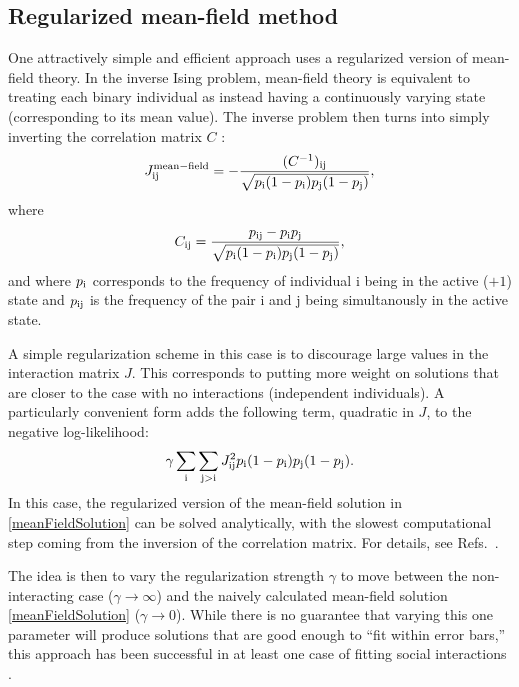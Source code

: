 \documentclass[aps,prl,twocolumn,nofootinbib]{revtex4-1}
\begin{document}
\subsection{Regularized mean-field method}
One attractively simple and efficient approach uses a regularized version of
mean-field theory.  In the inverse Ising problem, mean-field theory is equivalent
to treating each binary individual as instead having a continuously varying state
(corresponding to its mean value).  The inverse problem then turns into simply inverting
the correlation matrix $C$ \cite{CocMon12}:
\begin{equation}
\label{meanFieldSolution}
J^{\mathrm{mean-field}}_{\rm ij} =
    - \frac{ (C^{-1})_{\rm ij} }{ \sqrt{p_{\rm i}(1-p_{\rm i})p_{\rm j}(1-p_{\rm j})} },
\end{equation}
where
\begin{equation}
C_{\rm ij} = \frac{ p_{\rm ij} - p_{\rm i} p_{\rm j} }{ \sqrt{p_{\rm i}(1-p_{\rm i})p_{\rm j}(1-p_{\rm j})} },
\end{equation}
and where $p_{\rm i}$ corresponds to the frequency of individual i being
in the active ($+1$) state and $p_{\rm ij}$ is the frequency of the pair
i and j being simultanously in the active state.

A simple regularization scheme in this case is to discourage large values in the interaction
matrix $J$.  This corresponds to putting more weight on solutions that are closer to
the case with no interactions (independent individuals).  A particularly convenient form
adds the following term, quadratic in $J$, to the negative log-likelihood:
\begin{equation}
\gamma \sum_{\rm i} \sum_{\rm j > i} J_{\rm ij}^2 p_{\rm i} (1-p_{\rm i}) p_{\rm j} (1-p_{\rm j}).
\end{equation}
In this case, the regularized version of the mean-field solution in \eqref{meanFieldSolution}
can be solved analytically, with the slowest computational step coming from the inversion
of the correlation matrix.  For details, see Refs.~\cite{Daniels:1cq,BarCoc13}.

The idea is then to vary the regularization strength $\gamma$ to move between the
non-interacting case ($\gamma \rightarrow \infty$) and the naively calculated
mean-field solution \eqref{meanFieldSolution} ($\gamma \rightarrow 0$).
While there is no guarantee that varying this one parameter will produce solutions that are
good enough to ``fit within error bars,'' this approach has been successful in at least
one case of fitting social interactions \cite{Daniels:1cq}.
\end{document}
